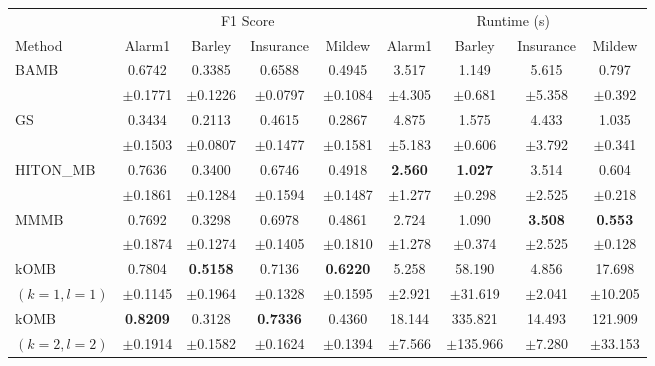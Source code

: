 \setlength{\tabcolsep}{4pt}
\begin{tabular}{lcccccccc}
\toprule
 & \multicolumn{4}{c}{F1 Score} & \multicolumn{4}{c}{Runtime (s)} \\
\cmidrule(lr){2-5}\cmidrule(lr){6-9}
Method & Alarm1 & Barley & Insurance & Mildew & Alarm1 & Barley & Insurance & Mildew \\
\midrule

BAMB
& 0.6742 & 0.3385 & 0.6588 & 0.4945 & 3.517 & 1.149 & 5.615 & 0.797 \\
& {\scriptsize $\pm$0.1771} & {\scriptsize $\pm$0.1226} & {\scriptsize $\pm$0.0797} & {\scriptsize $\pm$0.1084} & {\scriptsize $\pm$4.305} & {\scriptsize $\pm$0.681} & {\scriptsize $\pm$5.358} & {\scriptsize $\pm$0.392} \\

GS
& 0.3434 & 0.2113 & 0.4615 & 0.2867 & 4.875 & 1.575 & 4.433 & 1.035 \\
& {\scriptsize $\pm$0.1503} & {\scriptsize $\pm$0.0807} & {\scriptsize $\pm$0.1477} & {\scriptsize $\pm$0.1581} & {\scriptsize $\pm$5.183} & {\scriptsize $\pm$0.606} & {\scriptsize $\pm$3.792} & {\scriptsize $\pm$0.341} \\

HITON\_MB
& 0.7636 & 0.3400 & 0.6746 & 0.4918 & \textbf{2.560} & \textbf{1.027} & 3.514 & 0.604 \\
& {\scriptsize $\pm$0.1861} & {\scriptsize $\pm$0.1284} & {\scriptsize $\pm$0.1594} & {\scriptsize $\pm$0.1487} & {\scriptsize $\pm$1.277} & {\scriptsize $\pm$0.298} & {\scriptsize $\pm$2.525} & {\scriptsize $\pm$0.218} \\

MMMB
& 0.7692 & 0.3298 & 0.6978 & 0.4861 & 2.724 & 1.090 & \textbf{3.508} & \textbf{0.553} \\
& {\scriptsize $\pm$0.1874} & {\scriptsize $\pm$0.1274} & {\scriptsize $\pm$0.1405} & {\scriptsize $\pm$0.1810} & {\scriptsize $\pm$1.278} & {\scriptsize $\pm$0.374} & {\scriptsize $\pm$2.525} & {\scriptsize $\pm$0.128} \\

kOMB
& 0.7804 & \textbf{0.5158} & 0.7136 & \textbf{0.6220} & 5.258 & 58.190 & 4.856 & 17.698 \\
{\scriptsize $(k=1,l=1)$} & {\scriptsize $\pm$0.1145} & {\scriptsize $\pm$0.1964} & {\scriptsize $\pm$0.1328} & {\scriptsize $\pm$0.1595} & {\scriptsize $\pm$2.921} & {\scriptsize $\pm$31.619} & {\scriptsize $\pm$2.041} & {\scriptsize $\pm$10.205} \\

kOMB
& \textbf{0.8209} & 0.3128 & \textbf{0.7336} & 0.4360 & 18.144 & 335.821 & 14.493 & 121.909 \\
{\scriptsize $(k=2,l=2)$} & {\scriptsize $\pm$0.1914} & {\scriptsize $\pm$0.1582} & {\scriptsize $\pm$0.1624} & {\scriptsize $\pm$0.1394} & {\scriptsize $\pm$7.566} & {\scriptsize $\pm$135.966} & {\scriptsize $\pm$7.280} & {\scriptsize $\pm$33.153} \\
\bottomrule
\end{tabular}
